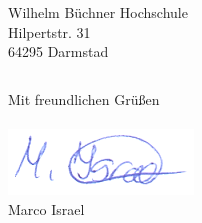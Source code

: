 \documentclass[
    version=last,           %
    DIV=13,                 %
    BCOR=0mm,               %
    paper=a4,               %
    fontsize=12pt,          %
    firsthead=on,           %
    firstfoot=on,           %
    pagenumber=on,i         %
    parskip=half,           %
    enlargefirstpage=,      %
    firsthead=on,           %
    fromrule=afteraddress,  %
    priority=off,           %
    backaddress=true,       %
    refline=dateright,      %
	fromalign=right,	    %
    fromemail=on,i          %
    fromurl=on,             %
    frombank=on,
    fromphone=on,           %
    frommobilephone=on      %
    fromlogo=on,            %
    addrfield=on,           %
    subject=untitled,  %
    foldmarks=off,          %
    numericaldate=off,      %
	pagenumber=right,	        %
	parskip=half,	        %
    headsep=false,          %
    footsepline=true,       %
    foldmarks=off,		    %
	]{scrlttr2}
\begin{document}
\begin{letter} {Wilhelm Büchner Hochschule \\
Hilpertstr. 31\\
64295 Darmstad}
\begin{itemize}
\begin{enumerate}
\begin{tabular}{|c|c|c| }
                \end{tabular}

        \end{enumerate}
\end{itemize}
\vspace{1cm}
Mit freundlichen Grüßen \\
\\
    \includegraphics[scale=0.70]{../unterschrift.png}
    \\
    Marco Israel




%





\end{letter}
\end{document}
